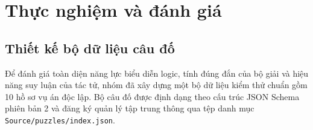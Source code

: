 \chapter{Thực nghiệm và đánh giá}
\label{chap:thuc-nghiem-danh-gia}

\section{Thiết kế bộ dữ liệu câu đố}
\label{sec:thiet-ke-du-lieu}

Để đánh giá toàn diện năng lực biểu diễn logic, tính đúng đắn của bộ giải và hiệu năng suy luận của tác tử, nhóm đã xây dựng một bộ dữ liệu kiểm thử chuẩn gồm 10 hồ sơ vụ án độc lập. Bộ câu đố được định dạng theo cấu trúc JSON Schema phiên bản 2 và đăng ký quản lý tập trung thông qua tệp danh mục \texttt{Source/puzzles/index.json}.

